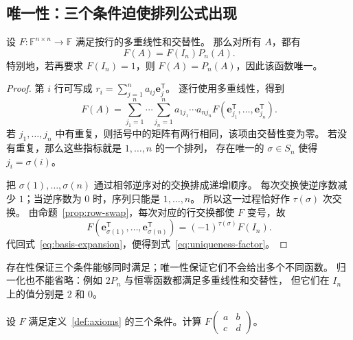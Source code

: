 \documentclass[UTF8,12pt,a4paper,fontset=fandol]{ctexart}
\begin{document}
\subsection{唯一性：三个条件迫使排列公式出现}

\begin{theorem}[交替多重线性函数的唯一性]
\label{thm:axiomatic-uniqueness}
设 $F:\mathbb F^{n\times n}\to\mathbb F$ 满足按行的多重线性和交替性。
那么对所有 $A$，都有
\begin{equation}
  F(A)=F(I_n)P_n(A).
  \label{eq:uniqueness-factor}
\end{equation}
特别地，若再要求 $F(I_n)=1$，则 $F(A)=P_n(A)$，因此该函数唯一。
\end{theorem}

\begin{proof}
第 $i$ 行可写成 $r_i=\sum_{j=1}^{n}a_{ij}\mathbf e_j^{\mathsf T}$。
逐行使用多重线性，得到
\begin{equation}
  F(A)=\sum_{j_1=1}^{n}\cdots\sum_{j_n=1}^{n}
  a_{1j_1}\cdots a_{nj_n}
  F(\mathbf e_{j_1}^{\mathsf T},\ldots,\mathbf e_{j_n}^{\mathsf T}).
  \label{eq:basis-expansion}
\end{equation}
若 $j_1,\ldots,j_n$ 中有重复，则括号中的矩阵有两行相同，该项由交替性变为零。
若没有重复，那么这些指标就是 $1,\ldots,n$ 的一个排列，
存在唯一的 $\sigma\in S_n$ 使得 $j_i=\sigma(i)$。

把 $\sigma(1),\ldots,\sigma(n)$ 通过相邻逆序对的交换排成递增顺序。
每次交换使逆序数减少 $1$；当逆序数为 $0$ 时，序列只能是 $1,\ldots,n$。
所以这一过程恰好作 $\tau(\sigma)$ 次交换。
由命题~\ref{prop:row-swap}，每次对应的行交换都使 $F$ 变号，故
\[
  F(\mathbf e_{\sigma(1)}^{\mathsf T},\ldots,
    \mathbf e_{\sigma(n)}^{\mathsf T})
  =(-1)^{\tau(\sigma)}F(I_n).
\]
代回式~\eqref{eq:basis-expansion}，便得到式~\eqref{eq:uniqueness-factor}。
\end{proof}

存在性保证三个条件能够同时满足；唯一性保证它们不会给出多个不同函数。
归一化也不能省略：例如 $2P_n$ 与恒零函数都满足多重线性和交替性，
但它们在 $I_n$ 上的值分别是 $2$ 和 $0$。

\begin{example}[由性质推导二阶公式]
设 $F$ 满足定义~\ref{def:axioms} 的三个条件。计算
$F\!\begin{pmatrix}a&b\\c&d\end{pmatrix}$。
\end{example}
\end{document}
